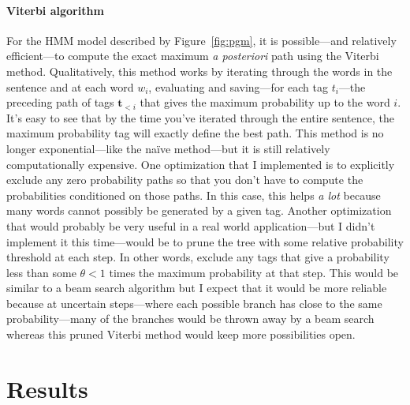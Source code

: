 \documentclass[11pt]{article}
\newcommand{\fig}[1]{Figure~\ref{fig:#1}}
\newcommand{\bvec}[1]{\ensuremath{\boldsymbol{#1}}}
\begin{document}
\paragraph{Viterbi algorithm}
For the HMM model described by \fig{pgm}, it is possible---and relatively
efficient---to compute the exact maximum \emph{a posteriori} path using the
Viterbi method.
Qualitatively, this method works by iterating through the words in the
sentence and at each word $w_i$, evaluating and saving---for each tag
$t_i$---the preceding path of tags $\bvec{t}_{<i}$ that gives the maximum
probability up to the word $i$.
It's easy to see that by the time you've iterated through the entire sentence,
the maximum probability tag will exactly define the best path.
This method is no longer exponential---like the na\"ive method---but it is
still relatively computationally expensive.
One optimization that I implemented is to explicitly exclude any zero
probability paths so that you don't have to compute the probabilities
conditioned on those paths.
In this case, this helps \emph{a lot} because many words cannot possibly be
generated by a given tag.
Another optimization that would probably be very useful in a real world
application---but I didn't implement it this time---would be to prune the tree
with some relative probability threshold at each step.
In other words, exclude any tags that give a probability less than some
$\theta < 1$ times the maximum probability at that step.
This would be similar to a beam search algorithm but I expect that it would be
more reliable because at uncertain steps---where each possible branch has
close to the same probability---many of the branches would be thrown away by a
beam search whereas this pruned Viterbi method would keep more possibilities
open.

\section{Results}
\end{document}
